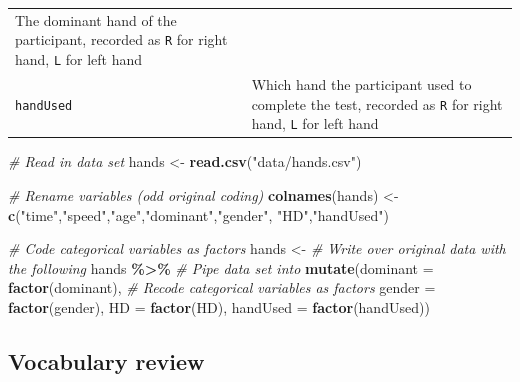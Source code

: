 \documentclass[
]{report}
\newenvironment{Shaded}{\begin{snugshade}}{\end{snugshade}}
\newcommand{\CommentTok}[1]{\textcolor[rgb]{0.56,0.35,0.01}{\textit{#1}}}
\newcommand{\DataTypeTok}[1]{\textcolor[rgb]{0.13,0.29,0.53}{#1}}
\newcommand{\KeywordTok}[1]{\textcolor[rgb]{0.13,0.29,0.53}{\textbf{#1}}}
\newcommand{\NormalTok}[1]{#1}
\newcommand{\OperatorTok}[1]{\textcolor[rgb]{0.81,0.36,0.00}{\textbf{#1}}}
\newcommand{\StringTok}[1]{\textcolor[rgb]{0.31,0.60,0.02}{#1}}
\begin{document}
\begin{longtable}[]{@{}ll@{}}
\begin{minipage}[t]{0.76\columnwidth}
The dominant hand of the participant, recorded as \texttt{R} for right hand, \texttt{L} for left hand\strut
\end{minipage}\tabularnewline
\begin{minipage}[t]{0.18\columnwidth}\raggedright
\texttt{handUsed}\strut
\end{minipage} & \begin{minipage}[t]{0.76\columnwidth}\raggedright
Which hand the participant used to complete the test, recorded as \texttt{R} for right hand, \texttt{L} for left hand\strut
\end{minipage}\tabularnewline
\bottomrule
\end{longtable}

\begin{Shaded}
\begin{Highlighting}[]
\CommentTok{\# Read in data set}
\NormalTok{hands \textless{}{-}}\StringTok{ }\KeywordTok{read.csv}\NormalTok{(}\StringTok{"data/hands.csv"}\NormalTok{)}

\CommentTok{\# Rename variables (odd original coding)}
\KeywordTok{colnames}\NormalTok{(hands) \textless{}{-}}\StringTok{ }\KeywordTok{c}\NormalTok{(}\StringTok{"time"}\NormalTok{,}\StringTok{"speed"}\NormalTok{,}\StringTok{"age"}\NormalTok{,}\StringTok{"dominant"}\NormalTok{,}\StringTok{"gender"}\NormalTok{,}
                     \StringTok{"HD"}\NormalTok{,}\StringTok{"handUsed"}\NormalTok{) }

\CommentTok{\# Code categorical variables as factors}
\NormalTok{hands \textless{}{-}}\StringTok{ }\CommentTok{\# Write over original data with the following}
\StringTok{  }\NormalTok{hands }\OperatorTok{\%\textgreater{}\%}\StringTok{ }\CommentTok{\# Pipe data set into}
\StringTok{  }\KeywordTok{mutate}\NormalTok{(}\DataTypeTok{dominant =} \KeywordTok{factor}\NormalTok{(dominant), }\CommentTok{\# Recode categorical variables as factors}
         \DataTypeTok{gender =} \KeywordTok{factor}\NormalTok{(gender),}
         \DataTypeTok{HD =} \KeywordTok{factor}\NormalTok{(HD),}
         \DataTypeTok{handUsed =} \KeywordTok{factor}\NormalTok{(handUsed))}
\end{Highlighting}
\end{Shaded}

\hypertarget{vocabulary-review}{%
\subsection*{Vocabulary review}\label{vocabulary-review}}
\end{document}
